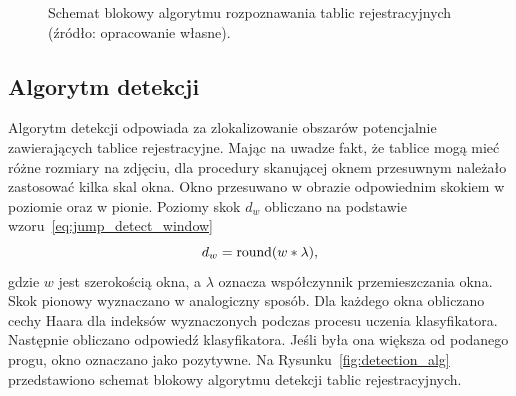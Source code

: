 \begin{figure}[!ht]
    \caption{Schemat blokowy algorytmu rozpoznawania tablic rejestracyjnych (źródło: opracowanie własne).}
    \label{fig:main_alg}
\end{figure}
\FloatBarrier

\subsection{Algorytm detekcji}
Algorytm detekcji odpowiada za zlokalizowanie obszarów potencjalnie zawierających tablice rejestracyjne.
Mając na uwadze fakt, że tablice mogą mieć różne rozmiary na zdjęciu, dla procedury skanującej oknem przesuwnym należało zastosować kilka skal okna.
Okno przesuwano w obrazie odpowiednim skokiem w poziomie oraz w pionie.
Poziomy skok $d_w$ obliczano na podstawie wzoru~\eqref{eq:jump_detect_window}
\begin{equation}
    \label{eq:jump_detect_window}
    d_w = \operatorname{round}(w * \lambda),
\end{equation}
gdzie $w$ jest szerokością okna, a $\lambda$ oznacza współczynnik przemieszczania okna.
Skok pionowy wyznaczano w analogiczny sposób.
Dla każdego okna obliczano cechy Haara dla indeksów wyznaczonych podczas procesu uczenia klasyfikatora.
Następnie obliczano odpowiedź klasyfikatora.
Jeśli była ona większa od podanego progu, okno oznaczano jako pozytywne.
Na Rysunku~\ref{fig:detection_alg} przedstawiono schemat blokowy algorytmu detekcji tablic rejestracyjnych.

